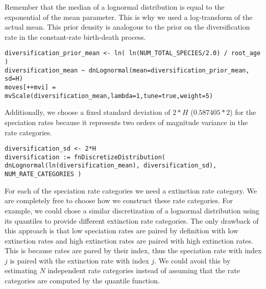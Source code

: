 Remember that the median of a lognormal distribution is equal to the exponential of the mean parameter.
This is why we used a log-transform of the actual mean.
This prior density is analogous to the prior on the diversification rate in the constant-rate birth-death process.
{\tt \begin{snugshade*}
\begin{lstlisting}
diversification_prior_mean <- ln( ln(NUM_TOTAL_SPECIES/2.0) / root_age )
diversification_mean ~ dnLognormal(mean=diversification_prior_mean, sd=H)
moves[++mvi] = mvScale(diversification_mean,lambda=1,tune=true,weight=5)
\end{lstlisting}
\end{snugshade*}}
Additionally, we choose a fixed standard deviation of $2*H$ ($0.587405*2$) for the speciation rates because it represents two orders of magnitude variance in the rate categories.
{\tt \begin{snugshade*}
\begin{lstlisting}
diversification_sd <- 2*H
diversification := fnDiscretizeDistribution( dnLognormal(ln(diversification_mean), diversification_sd), NUM_RATE_CATEGORIES )
\end{lstlisting}
\end{snugshade*}}
For each of the speciation rate categories we need a extinction rate category.
We are completely free to choose how we construct these rate categories.
For example, we could chose a similar discretization of a lognormal distribution using its quantiles to provide different extinction rate categories.
The only drawback of this approach is that low speciation rates are paired by definition with low extinction rates and high extinction rates are paired with high extinction rates.
This is because rates are pared by their index, thus the speciation rate with index $j$ is paired with the extinction rate with index $j$.
We could avoid this by estimating $N$ independent rate categories instead of assuming that the rate categories are computed by the quantile function.

